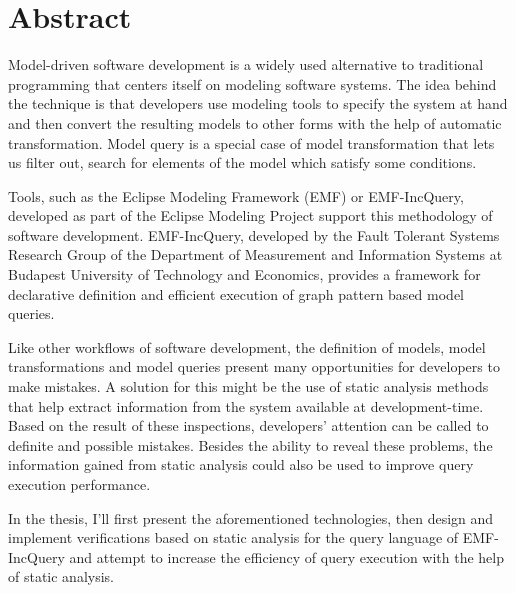\chapter*{Abstract}

Model-driven software development is a widely used alternative to traditional programming that centers itself on modeling software systems.
The idea behind the technique is that developers use modeling tools to specify the system at hand and then convert the resulting models to other forms with the help of automatic transformation.
Model query is a special case of model transformation that lets us filter out, search for elements of the model which satisfy some conditions.

Tools, such as the Eclipse Modeling Framework (EMF) or EMF-IncQuery, developed as part of the Eclipse Modeling Project support this methodology of software development.
EMF-IncQuery, developed by the Fault Tolerant Systems Research Group of the Department of Measurement and Information Systems at Budapest University of Technology and Economics, provides a framework for declarative definition and efficient execution of graph pattern based model queries.

Like other workflows of software development, the definition of models, model transformations and model queries present many opportunities for developers to make mistakes.
A solution for this might be the use of static analysis methods that help extract information from the system available at development-time.
Based on the result of these inspections, developers' attention can be called to definite and possible mistakes.
Besides the ability to reveal these problems, the information gained from static analysis could also be used to improve query execution performance.

In the thesis, I'll first present the aforementioned technologies, then design and implement verifications based on static analysis for the query language of EMF-IncQuery and attempt to increase the efficiency of query execution with the help of static analysis.

\vfill
